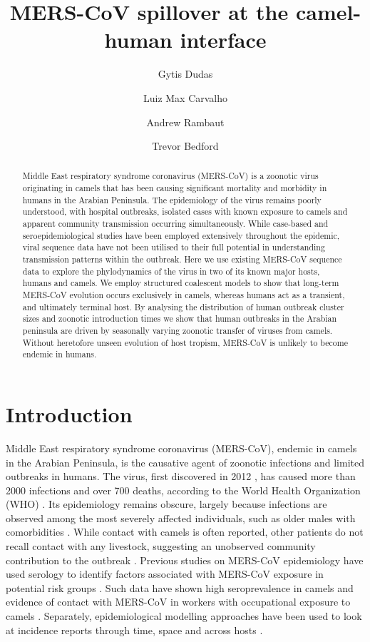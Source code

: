 \documentclass[11pt,oneside,letterpaper]{article}
\title{\vspace{1.0cm} \LARGE \bf MERS-CoV spillover at the camel-human interface}
\author[1]{Gytis Dudas}
\author[2]{Luiz Max Carvalho}
\author[2,3]{Andrew Rambaut}
\author[1]{Trevor Bedford}
\affil[1]{Vaccine and Infectious Disease Division, Fred Hutchinson Cancer Research Center, Seattle, WA, USA}
\affil[2]{Institute of Evolutionary Biology, University of Edinburgh, Edinburgh, UK}
\affil[3]{Fogarty International Center, National Institutes of Health, Bethesda, MD, USA}
\begin{document}
\maketitle

\begin{abstract}

Middle East respiratory syndrome coronavirus (MERS-CoV) is a zoonotic virus originating in camels that has been causing significant mortality and morbidity in humans in the Arabian Peninsula.
The epidemiology of the virus remains poorly understood, with hospital outbreaks, isolated cases with known exposure to camels and apparent community transmission occurring simultaneously.
While case-based and seroepidemiological studies have been employed extensively throughout the epidemic, viral sequence data have not been utilised to their full potential in understanding transmission patterns within the outbreak.
Here we use existing MERS-CoV sequence data to explore the phylodynamics of the virus in two of its known major hosts, humans and camels.
We employ structured coalescent models to show that long-term MERS-CoV evolution occurs exclusively in camels, whereas humans act as a transient, and ultimately terminal host.
By analysing the distribution of human outbreak cluster sizes and zoonotic introduction times we show that human outbreaks in the Arabian peninsula are driven by seasonally varying zoonotic transfer of viruses from camels.
Without heretofore unseen evolution of host tropism, MERS-CoV is unlikely to become endemic in humans.

\end{abstract}

\pagebreak

\section*{Introduction}
Middle East respiratory syndrome coronavirus (MERS-CoV), endemic in camels in the Arabian Peninsula, is the causative agent of zoonotic infections and limited outbreaks in humans.
The virus, first discovered in 2012 \citep{zaki_isolation_2012,boheemen_genomic_2012}, has caused more than 2000  infections and over 700 deaths, according to the World Health Organization (WHO) \citep{who_mers_summary_2017}.
Its epidemiology remains obscure, largely because infections are observed among the most severely affected individuals, such as older males with comorbidities \citep{assiri_2013,group_state_2013}.
While contact with camels is often reported, other patients do not recall contact with any livestock, suggesting an unobserved community contribution to the outbreak \citep{group_state_2013}.
Previous studies on MERS-CoV epidemiology have used serology to identify factors associated with MERS-CoV exposure in potential risk groups \citep{reusken_occupational_2015,reusken_2013}.
Such data have shown high seroprevalence in camels \citep{muller_2014,corman_antibodies_2014,chu_2014,reusken_2013,reusken_2014} and evidence of contact with MERS-CoV in workers with occupational exposure to camels \citep{reusken_occupational_2015,muller_presence_2015}.
Separately, epidemiological modelling approaches have been used to look at incidence reports through time, space and across hosts \citep{cauchemez_unraveling_2016}.
\end{document}
